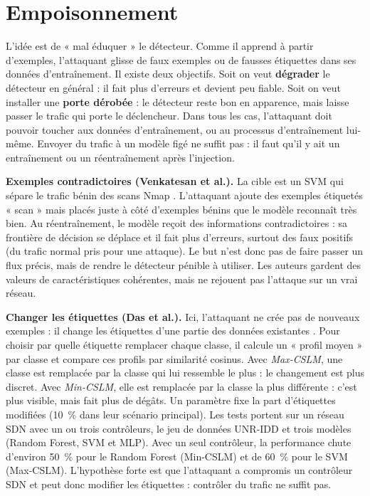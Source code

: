 \documentclass[a4paper,10pt]{article}
\begin{document}
\section{Empoisonnement}
L'idée est de « mal éduquer » le détecteur. Comme il apprend à partir
d'exemples, l'attaquant glisse de faux exemples ou de fausses étiquettes dans
ses données d'entraînement. Il existe deux objectifs. Soit on veut
\textbf{dégrader} le détecteur en général : il fait plus d'erreurs et devient
peu fiable. Soit on veut installer une \textbf{porte dérobée} : le détecteur
reste bon en apparence, mais laisse passer le trafic qui porte le déclencheur.
Dans tous les cas, l'attaquant doit pouvoir toucher aux données
d'entraînement, ou au processus d'entraînement lui-même. Envoyer du trafic à un
modèle figé ne suffit pas : il faut qu'il y ait un entraînement ou un
réentraînement après l'injection.

\newpage
\textbf{Exemples contradictoires (Venkatesan et al.).} La cible est un SVM qui
sépare le trafic bénin des scans Nmap \cite{venkatesan}. L'attaquant ajoute des
exemples étiquetés « scan » mais placés juste à côté d'exemples bénins que le
modèle reconnaît très bien. Au réentraînement, le modèle reçoit des
informations contradictoires : sa frontière de décision se déplace et il fait
plus d'erreurs, surtout des faux positifs (du trafic normal pris pour une
attaque). Le but n'est donc pas de faire passer un flux précis, mais de rendre
le détecteur pénible à utiliser. Les auteurs gardent des valeurs de
caractéristiques cohérentes, mais ne rejouent pas l'attaque sur un vrai réseau.

\textbf{Changer les étiquettes (Das et al.).} Ici, l'attaquant ne crée pas de
nouveaux exemples : il change les étiquettes d'une partie des données
existantes \cite{das}. Pour choisir par quelle étiquette remplacer chaque
classe, il calcule un « profil moyen » par classe et compare ces profils par
similarité cosinus. Avec \emph{Max-CSLM}, une classe est remplacée par la
classe qui lui ressemble le plus : le changement est plus discret. Avec
\emph{Min-CSLM}, elle est remplacée par la classe la plus différente : c'est
plus visible, mais fait plus de dégâts. Un paramètre fixe la part
d'étiquettes modifiées (10~\% dans leur scénario principal). Les tests portent
sur un réseau SDN avec un ou trois contrôleurs, le jeu de données UNR-IDD et
trois modèles (Random Forest, SVM et MLP). Avec un seul contrôleur, la
performance chute d'environ 50~\% pour le Random Forest (Min-CSLM) et de 60~\%
pour le SVM (Max-CSLM). L'hypothèse forte est que l'attaquant a compromis un
contrôleur SDN et peut donc modifier les étiquettes : contrôler du trafic ne
suffit pas.
\end{document}
